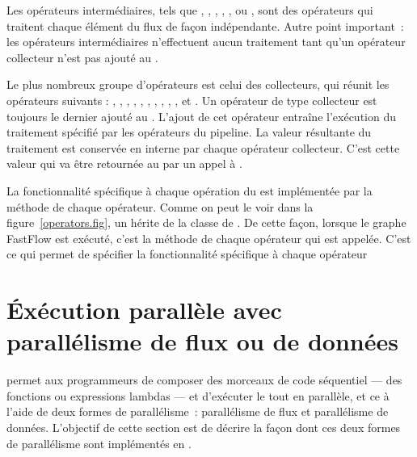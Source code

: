 Les op\'erateurs interm\'ediaires, tels que , , , , ,  ou , sont des op\'erateurs qui traitent chaque \'el\'ement du flux de fa\c{c}on ind\'ependante. Autre point important~: les op\'erateurs interm\'ediaires n'effectuent aucun traitement tant qu'un op\'erateur collecteur n'est pas ajout\'e au . 

Le plus nombreux groupe d'op\'erateurs est celui des collecteurs, qui réunit les op\'erateurs suivants : , , , , , , , , , ,  et . Un op\'erateur de type collecteur est toujours le dernier ajout\'e au . L'ajout de cet op\'erateur entra\^ine l'ex\'ecution du traitement spécifié par les opérateurs du pipeline. La valeur r\'esultante du traitement est conserv\'ee en interne par chaque op\'erateur collecteur. C'est cette valeur qui va \^etre retourn\'ee au  par un appel à .

La fonctionnalit\'e sp\'ecifique \`a chaque op\'eration du  est impl\'ement\'ee par la m\'ethode  de chaque op\'erateur. Comme on peut le voir dans la figure~\ref{operators.fig}, un  h\'erite de la classe  de . De cette fa\c {c}on, lorsque le graphe FastFlow est exécuté, c'est la méthode  de chaque op\'erateur qui est appel\'ee. C'est ce qui permet de spécifier la fonctionnalit\'e spécifique à chaque opérateur 








\section{\'Ex\'ecution parall\`ele avec parall\'elisme de flux ou de donn\'ees}

 permet aux programmeurs de composer des morceaux de code s\'equentiel --- des fonctions ou expressions lambdas --- et d'ex\'ecuter le tout en parall\`ele, et ce à l'aide de deux formes de parallélisme~:
parall\'elisme de flux et parall\'elisme de donn\'ees.
%
L'objectif de cette section est de d\'ecrire la façon dont ces deux formes de parall\'elisme sont impl\'ement\'es en . 

